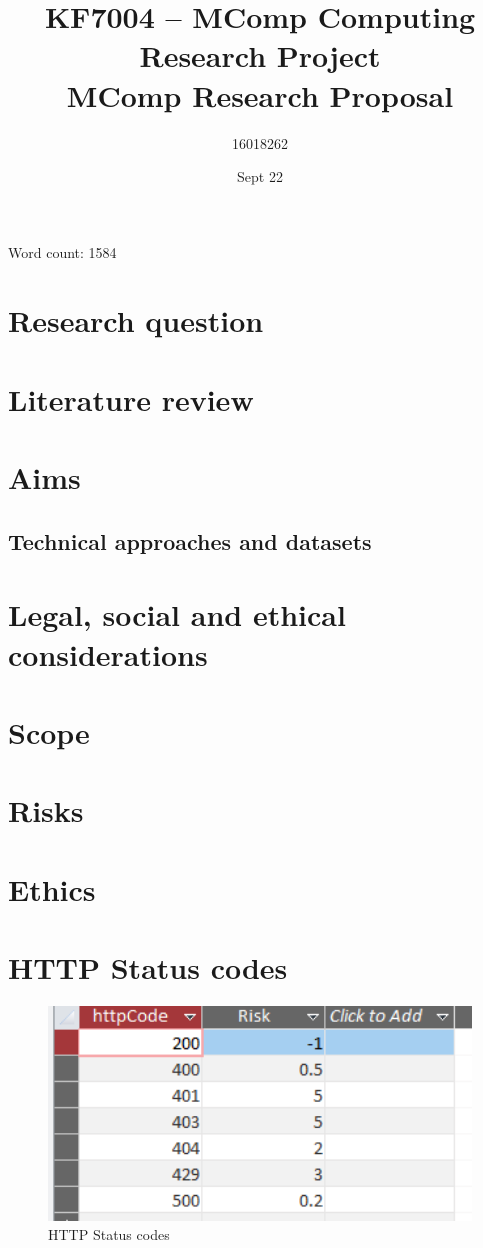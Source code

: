 \documentclass[10pt]{article}
\title{KF7004 – MComp Computing Research Project \\ MComp Research Proposal}
\author{16018262}
\date{Sept 22}
\begin{document}
\maketitle
\begin{center}
	Word count: 1584
\end{center}
\tableofcontents
\section{Research question}

\section{Literature review}

\section{Aims}

\subsection{Technical approaches and datasets}

\section{Legal, social and ethical considerations}

\section{Scope}

\section{Risks}


\printbibliography
\appendix
\section{Ethics} \label{ethics}

\newpage
\section{HTTP Status codes} \label{codes}
\vspace{5mm} %
\begin{figure}[] \label{HTTP Status codes}
    \centering
     \includegraphics[width=170mm]{images/HTTP.png}
    \caption{HTTP Status codes}
    \label{fig:my_label}
\end{figure}
\end{document}
